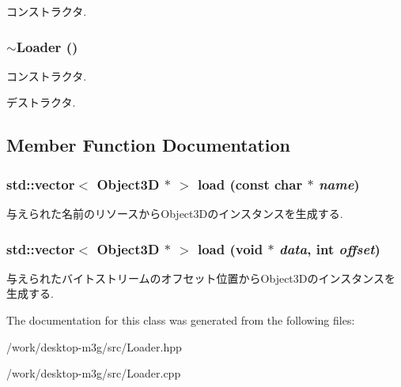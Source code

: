 コンストラクタ. \hypertarget{classm3g_1_1Loader_8bd25dd3f34914f06852c2de2f9db737}{
\subsubsection[{$\sim$Loader}]{\setlength{\rightskip}{0pt plus 5cm}$\sim${\bf Loader} ()}}
\label{classm3g_1_1Loader_8bd25dd3f34914f06852c2de2f9db737}


コンストラクタ.

デストラクタ. 

\subsection{Member Function Documentation}
\hypertarget{classm3g_1_1Loader_27bd86888cdadd349223dcb303e45879}{
\subsubsection[{load}]{\setlength{\rightskip}{0pt plus 5cm}std::vector$<$ {\bf Object3D} $\ast$ $>$ load (const char $\ast$ {\em name})}}
\label{classm3g_1_1Loader_27bd86888cdadd349223dcb303e45879}


与えられた名前のリソースからObject3Dのインスタンスを生成する. \hypertarget{classm3g_1_1Loader_7abddd36a9ee70e67de0e2183bba1aed}{
\subsubsection[{load}]{\setlength{\rightskip}{0pt plus 5cm}std::vector$<$ {\bf Object3D} $\ast$ $>$ load (void $\ast$ {\em data}, \/  int {\em offset})}}
\label{classm3g_1_1Loader_7abddd36a9ee70e67de0e2183bba1aed}


与えられたバイトストリームのオフセット位置からObject3Dのインスタンスを生成する. 

The documentation for this class was generated from the following files:\begin{CompactItemize}
\item 
/work/desktop-m3g/src/Loader.hpp\item 
/work/desktop-m3g/src/Loader.cpp\end{CompactItemize}
